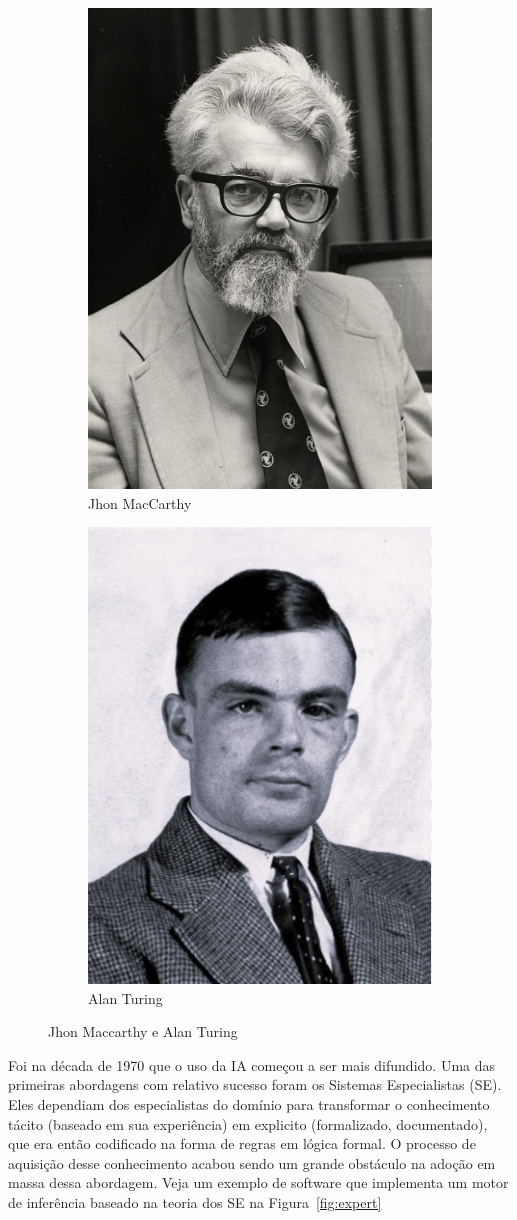 \documentclass[a4paper,12pt]{book}
\begin{document}
\begin{figure}
    \centering
    \begin{subfigure}[b]{0.45\textwidth}
        \centering
        \includegraphics[width=0.5\linewidth]{figuras/jhon_macharthy}
		\caption{Jhon MacCarthy}
        \label{fig:jhon}
    \end{subfigure}
    \hfill
    \begin{subfigure}[b]{0.45\textwidth}
        \centering
		\includegraphics[width=0.5\linewidth]{figuras/alan_turing.png}
        \caption{Alan Turing}
        \label{fig:alan}
    \end{subfigure}
    \caption{Jhon Maccarthy e Alan Turing}
    \label{fig:jhonalan}
\end{figure}

Foi na década de 1970 que o uso da IA começou a ser mais difundido. Uma das primeiras abordagens com relativo sucesso foram os Sistemas Especialistas (SE). Eles dependiam dos especialistas do domínio para transformar o conhecimento tácito (baseado em sua experiência) em explicito (formalizado, documentado), que era então codificado na forma de regras em lógica formal. O processo de aquisição desse conhecimento acabou sendo um grande obstáculo na adoção em massa dessa abordagem. Veja um exemplo de software que implementa um motor de inferência baseado na teoria dos SE na Figura~\ref{fig:expert}
\end{document}
